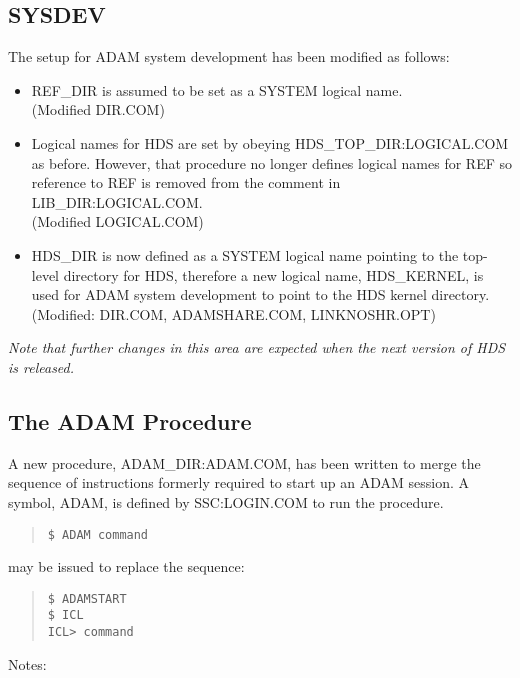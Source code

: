 \subsection{SYSDEV}
The setup for ADAM system development has been modified as follows:
\begin{itemize}
\item REF\_DIR is assumed to be set as a SYSTEM logical name.\\
(Modified DIR.COM)
\item Logical names for HDS are set by obeying HDS\_TOP\_DIR:LOGICAL.COM as
before. However, that procedure no longer defines logical names for REF so
reference to REF is removed from the comment in LIB\_DIR:LOGICAL.COM.\\
(Modified LOGICAL.COM)
\item HDS\_DIR is now defined as a SYSTEM logical name pointing to the 
top-level directory for HDS, therefore a new logical name, HDS\_KERNEL, is used
for ADAM system development to point to the HDS kernel directory.\\
(Modified: DIR.COM, ADAMSHARE.COM, LINKNOSHR.OPT)
\end{itemize}
{\em Note that further changes in this area are expected when the next version
of HDS is released.}

\subsection{The ADAM Procedure}
A new procedure, ADAM\_DIR:ADAM.COM, has been written to merge the sequence
of instructions formerly required to start up an ADAM session.
A symbol, ADAM, is defined by SSC:LOGIN.COM to run the procedure.
\begin{quote} \begin{verbatim}
$ ADAM command
\end{verbatim} \end{quote}
may be issued to replace the sequence:
\begin{quote} \begin{verbatim}
$ ADAMSTART
$ ICL
ICL> command
\end{verbatim} \end{quote}

Notes:

